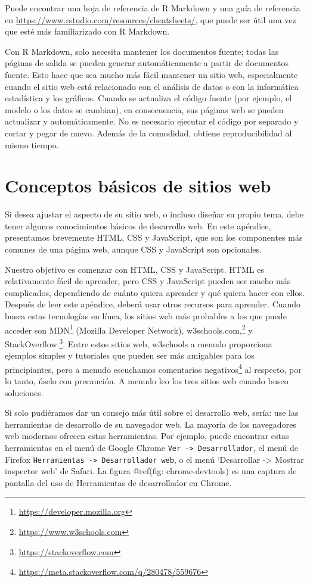 \documentclass[12pt,]{krantz}
\renewcommand{\href}[2]{#2\footnote{\url{#1}}}
\theoremstyle{definition}
\theoremstyle{definition}
\theoremstyle{definition}
\theoremstyle{remark}
\begin{document}
Puede encontrar una hoja de referencia de R Markdown y una guía de
referencia en \url{https://www.rstudio.com/resources/cheatsheets/}, que
puede ser útil una vez que esté más familiarizado con R Markdown.

Con R Markdown, solo necesita mantener los documentos fuente; todas las
páginas de salida se pueden generar automáticamente a partir de
documentos fuente. Esto hace que sea mucho más fácil mantener un sitio
web, especialmente cuando el sitio web está relacionado con el análisis
de datos o con la informática estadística y los gráficos. Cuando se
actualiza el código fuente (por ejemplo, el modelo o los datos se
cambian), en consecuencia, sus páginas web se pueden actualizar y
automáticamente. No es necesario ejecutar el código por separado y
cortar y pegar de nuevo. Además de la comodidad, obtiene
reproducibilidad al mismo tiempo.

\hypertarget{conceptos-basicos-de-sitios-web}{%
\chapter{Conceptos básicos de sitios
web}\label{conceptos-basicos-de-sitios-web}}

Si desea ajustar el aspecto de su sitio web, o incluso diseñar su propio
tema, debe tener algunos conocimientos básicos de desarrollo web. En
este apéndice, presentamos brevemente HTML, CSS y JavaScript, que son
los componentes más comunes de una página web, aunque CSS y JavaScript
son opcionales.

Nuestro objetivo es comenzar con HTML, CSS y JavaScript. HTML es
relativamente fácil de aprender, pero CSS y JavaScript pueden ser mucho
más complicados, dependiendo de cuánto quiera aprender y qué quiera
hacer con ellos. Después de leer este apéndice, deberá usar otros
recursos para aprender. Cuando busca estas tecnologías en línea, los
sitios web más probables a los que puede acceder son
\href{https://developer.mozilla.org}{MDN} (Mozilla Developer Network),
\href{https://www.w3schools.com}{w3schools.com,} y
\href{https://stackoverflow.com}{StackOverflow.}. Entre estos sitios
web, w3schools a menudo proporciona ejemplos simples y tutoriales que
pueden ser más amigables para los principiantes, pero a menudo
escuchamos
\href{https://meta.stackoverflow.com/q/280478/559676}{comentarios
negativos} al respecto, por lo tanto, úselo con precaución. A menudo leo
los tres sitios web cuando busco soluciones.

Si solo pudiéramos dar un consejo más útil sobre el desarrollo web,
sería: use las herramientas de desarrollo de su navegador web. La
mayoría de los navegadores web modernos ofrecen estas herramientas. Por
ejemplo, puede encontrar estas herramientas en el menú de Google Chrome
\texttt{Ver\ -\textgreater{}\ Desarrollador}, el menú de Firefox
\texttt{Herramientas\ -\textgreater{}\ Desarrollador\ web}, o el menú
`Desarrollar -\textgreater{} Mostrar inspector web' de Safari. La figura
@ref(fig: chrome-devtools) es una captura de pantalla del uso de
Herramientas de desarrollador en Chrome.
\end{document}
